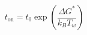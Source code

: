 \begin{equation}
  t_{\mathrm{on}} = t_0 \exp\left(\frac{\Delta G^*}{k_B T_w}\right)
  \label{eq:onset}
\end{equation}